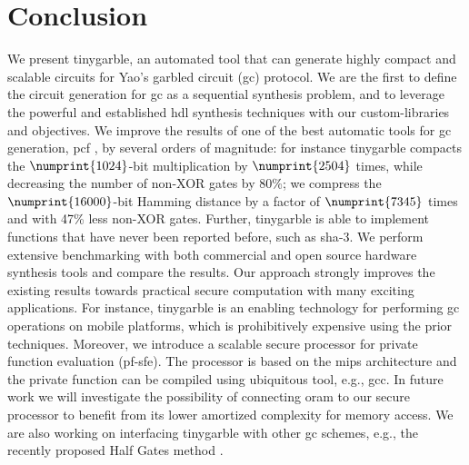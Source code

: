 \chapter{Conclusion}
We present \gls{tinygarble}, an automated tool that can generate highly compact and scalable circuits for Yao's garbled circuit (\acrshort{gc}) protocol.
We are the first to define the circuit generation for \acrshort{gc} as a sequential synthesis problem, and to leverage the powerful and established \acrshort{hdl} synthesis techniques with our custom-libraries and objectives.
We improve the results of one of the best automatic tools for \acrshort{gc} generation, \gls{pcf} \cite{kreuter2013pcf}, by several orders of magnitude: for instance \gls{tinygarble} compacts the $\numprint{1024}$-bit multiplication by $\numprint{2504}$ times, while decreasing the number of non-XOR gates by 80\%; we compress the $\numprint{16000}$-bit Hamming distance by a factor of $\numprint{7345}$ times and with 47\% less non-XOR gates.
Further, \gls{tinygarble} is able to implement functions that have never been reported before, such as \acrshort{sha}-3.
We perform extensive benchmarking with both commercial and open source hardware synthesis tools and compare the results.
Our approach strongly improves the existing results towards practical secure computation with many exciting applications.
For instance, \gls{tinygarble} is an enabling technology for performing \acrshort{gc} operations on mobile platforms, which is prohibitively expensive using the prior techniques.
Moreover, we introduce a scalable secure processor for private function evaluation (\acrshort{pf-sfe}).
The processor is based on the \gls{mips} architecture and the private function can be compiled using ubiquitous tool, e.g., gcc.
In future work we will investigate the possibility of connecting \acrfull{oram} to our secure processor to benefit from its lower amortized complexity for memory access.
We are also working on interfacing \gls{tinygarble} with other \acrshort{gc} schemes, e.g., the recently proposed Half Gates method \cite{zahur2015two}.
